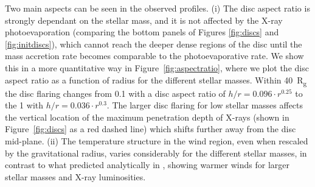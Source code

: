 \documentclass[usenatbib,useAMS,usedcolumn]{mnras}
\begin{document}
Two main aspects can be seen in the observed profiles. 
(i) The disc aspect ratio is strongly dependant on the stellar mass, and it is not affected by the X-ray photoevaporation (comparing the bottom panels of Figures \ref{fig:discs} and \ref{fig:initdiscs}), which cannot reach the deeper dense regions of the disc until the mass accretion rate becomes comparable to the photoevaporative rate. We show this in a more quantitative way in Figure~\ref{fig:aspectratio}, where we plot the disc aspect ratio as a function of radius for the different stellar masses. Within \SI{40}{R_g} the disc flaring changes from \SI{0.1}{\solarmass} with a disc aspect ratio of $h/r = 0.096 \cdot r^{0.25}$ to the \SI{1}{\solarmass} with $h/r = 0.036 \cdot r^{0.3}$. The larger disc flaring for low stellar masses affects the vertical location of the maximum penetration depth of X-rays (shown in Figure~\ref{fig:discs} as a red dashed line) which shifts further away from the disc mid-plane.
(ii) The temperature structure in the wind region, even when rescaled by the gravitational radius, varies considerably for the different stellar masses, in contrast to what predicted analytically in , showing warmer winds for larger stellar masses and X-ray luminosities.
\end{document}
